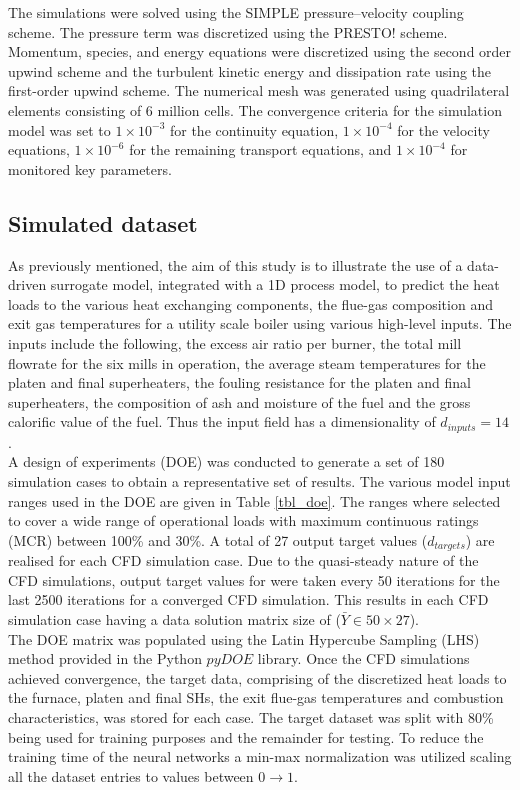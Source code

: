 \documentclass[a4paper,fleqn]{cas-dc}
\begin{document}
The simulations were solved using the SIMPLE pressure–velocity coupling scheme. The pressure term was discretized using the PRESTO! scheme. Momentum, species, and energy equations were discretized using the second order upwind scheme and the turbulent kinetic energy and dissipation rate using the first-order upwind scheme. The numerical mesh was generated using quadrilateral elements consisting of 6 million cells.  The convergence criteria for the simulation model was set to $1\times10^{-3}$ for the continuity equation, $1\times10^{-4}$ for the velocity equations, $1\times10^{-6}$ for the remaining transport equations, and $1\times10^{-4}$ for monitored key parameters.

\subsection{Simulated dataset}
As previously mentioned, the aim of this study is to illustrate the use of a data-driven surrogate model, integrated with a 1D process model, to predict the heat loads to the various heat exchanging components, the flue-gas composition and exit gas temperatures for a utility scale boiler using various high-level inputs. The inputs include the following, the excess air ratio per burner, the total mill flowrate for the six mills in operation, the average steam temperatures for the platen and final superheaters, the fouling resistance for the platen and final superheaters, the composition of ash and moisture of the fuel and the gross calorific value of the fuel. Thus the input field has a dimensionality of $d_{inputs}=14$.\\

A design of experiments (DOE) was conducted to generate a set of 180 simulation cases to obtain a representative set of results. The various model input ranges used in the DOE are given in Table \ref{tbl_doe}. The ranges where selected to cover a wide range of operational loads with maximum continuous ratings (MCR) between 100\% and 30\%. A total of 27 output target values ($d_{targets}$) are realised for each CFD simulation case. Due to the quasi-steady nature of the CFD simulations, output target values for were taken every 50 iterations for the last 2500 iterations for a converged CFD simulation. This results in each CFD simulation case having a data solution matrix size of ($\bar{Y}\in50\times27$).\\

The DOE matrix was populated using the Latin Hypercube Sampling (LHS) method provided in the Python $pyDOE$ library. Once the CFD simulations achieved convergence, the target data, comprising of the discretized heat loads to the furnace, platen and final SHs, the exit flue-gas temperatures and combustion characteristics, was stored for each case. The target dataset was split with 80\% being used for training purposes and the remainder for testing. To reduce the training time of the neural networks a min-max normalization was utilized scaling all the dataset entries to values between $0\rightarrow1$.\\
\end{document}
